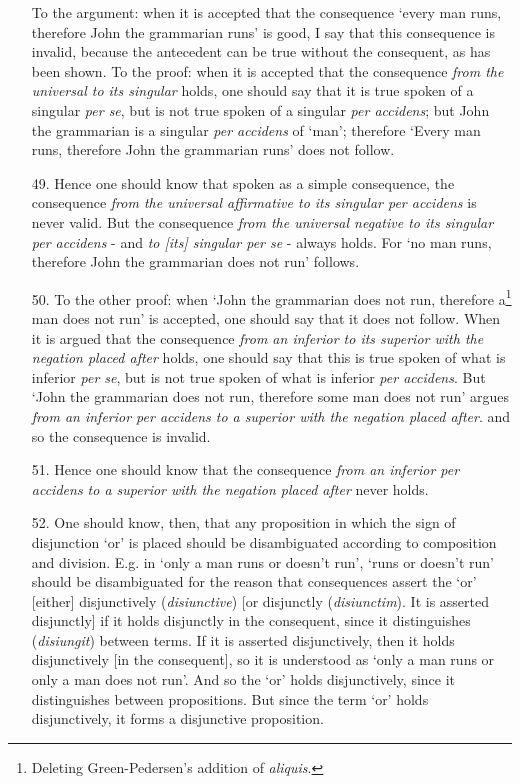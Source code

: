 \documentclass[]{article}
\begin{document}
\begin{enumerate}
To the argument: when it is accepted that the consequence `every man runs, therefore John the grammarian runs' is good, I say that this consequence is invalid, because the antecedent can be true without the consequent, as has been shown. To the proof: when it is accepted that the consequence \textit{from the universal to its singular} holds, one should say that it is true spoken of a singular \textit{per se}, but is not true spoken of a singular \textit{per accidens}; but John the grammarian is a singular \textit{per accidens} of `man'; therefore `Every man runs, therefore John the grammarian runs' does not follow.
\item[49.] Hence one should know that spoken as a simple consequence, the consequence \textit{from the universal affirmative to its singular per accidens} is never valid. But the consequence \textit{from the universal negative to its singular per accidens}  - and \textit{to [its] singular per se} - always holds. For `no man runs, therefore John the grammarian does not run' follows. 
\item[50.] To the other proof: when `John the grammarian does not run, therefore a\footnote{Deleting Green-Pedersen's addition of \textit{aliquis}.} man does not run' is accepted, one should say that it does not follow. When it is argued that the consequence \textit{from an inferior to its superior with the negation placed after} holds, one should say that this is true spoken of what is inferior \textit{per se}, but is not true spoken of what is inferior \textit{per accidens}. But `John the grammarian does not run, therefore some man does not run' argues \textit{from an inferior per accidens to a superior with the negation placed after}. and so the consequence is invalid.
\item[51.] Hence one should know that the consequence \textit{from an inferior per accidens to a superior with the negation placed after} never holds.
\item[52.] One should know, then, that any proposition in which the sign of disjunction `or' is placed should be disambiguated according to composition and division. E.g. in `only a man runs or doesn't run', `runs or doesn't run' should be disambiguated for the reason that consequences assert the `or' [either] disjunctively (\textit{disiunctive}) [or disjunctly (\textit{disiunctim}). It is asserted disjunctly] if it holds disjunctly in the consequent, since it distinguishes (\textit{disiungit}) between terms. If it is asserted disjunctively, then it holds disjunctively [in the consequent], so it is understood as `only a man runs or only a man does not run'. And so the `or' holds disjunctively, since it distinguishes between propositions. But since the term `or' holds disjunctively, it forms a disjunctive proposition.

\end{enumerate}
\end{document}

